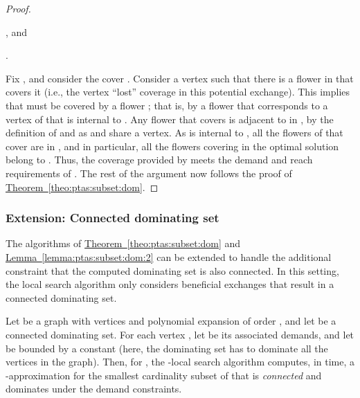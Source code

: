 \documentclass[12pt]{article}
\theoremstyle{remark}\theoremheaderfont{\sf}\theorembodyfont{\upshape}
\numberwithin{figure}{section}\numberwithin{table}{section}\numberwithin{equation}{section}
\newcommand{\HLink}[2]{\hyperref[#2]{#1~\ref*{#2}}}
\newcommand{\HLinkPage}[2]{\hyperref[#2]{#1~\ref*{#2}}}
\newcommand{\seclab}[1]{\label{sec:#1}} \newcommand{\secref}[1]{\HLink{Section}{sec:#1}} \newcommand{\secrefpage}[1]{\HLinkPage{Section}{sec:#1}}
\newcommand{\lemlab}[1]{\label{lemma:#1}}
\newcommand{\lemref}[1]{\HLink{Lemma}{lemma:#1}}
\newcommand{\thmref}[1]{\HLink{Theorem}{theo:#1}}
\begin{document}
\begin{proof}
\begin{compactenum}[\qquad(i)]
  \item
    ,
    and 

  \item .
  \end{compactenum}Fix , and consider the cover
  .
  Consider a vertex  such that there is a flower in
   that covers it (i.e., the vertex
  ``lost'' coverage in this potential exchange).  This implies that
   must be covered by a flower ; that is,
  by a flower that corresponds to a vertex of  that is
  internal to .  Any flower  that
  covers  is adjacent to  in , by the definition
  of  and as  and  share a vertex.  As
   is internal to , all the flowers of 
  that cover  are in , and in particular, all the
  flowers covering  in the optimal solution belong to
  . Thus, the coverage provided by  meets the
  demand and reach requirements of . The rest of the argument now
  follows the proof of \thmref{ptas:subset:dom}.
\end{proof}


\subsubsection{Extension: Connected dominating set}
\seclab{connected:dominating:set}

The algorithms of \thmref{ptas:subset:dom} and
\lemref{ptas:subset:dom:2} can be extended to handle the additional
constraint that the computed dominating set is also connected.  In
this setting, the local search algorithm only considers beneficial
exchanges that result in a connected dominating set.



\begin{lemma}
  \lemlab{ptas:subset:dom:3}Let  be a graph with  vertices and polynomial
  expansion of order , and let  be a
  connected dominating set. For each vertex , let
   be its associated demands, and let
   be bounded by a
  constant (here, the dominating set has to dominate all the vertices
  in the graph). Then, for
  , the
  -local search algorithm computes, in 
  time, a -approximation for the smallest cardinality subset
  of  that is \emph{connected} and dominates 
  under the demand constraints.
\end{lemma}
\end{document}
